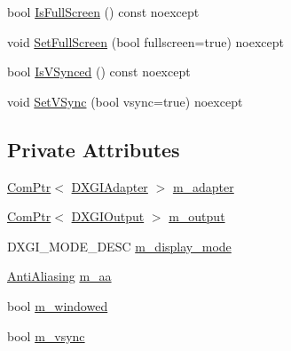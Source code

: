 \begin{DoxyCompactItemize}
\item 
bool \mbox{\hyperlink{classmage_1_1rendering_1_1_display_configuration_a507e755923af2ba1338cc041b5df8e0a}{Is\+Full\+Screen}} () const noexcept
\item 
void \mbox{\hyperlink{classmage_1_1rendering_1_1_display_configuration_a5e15cc1ca56718a7892b80cd0a1d20c0}{Set\+Full\+Screen}} (bool fullscreen=true) noexcept
\item 
bool \mbox{\hyperlink{classmage_1_1rendering_1_1_display_configuration_a6447404f1d720b98b37f684ba0e790a0}{Is\+V\+Synced}} () const noexcept
\item 
void \mbox{\hyperlink{classmage_1_1rendering_1_1_display_configuration_a304a29762afd99caa1672ef6cc259fb3}{Set\+V\+Sync}} (bool vsync=true) noexcept
\end{DoxyCompactItemize}
\subsection*{Private Attributes}
\begin{DoxyCompactItemize}
\item 
\mbox{\hyperlink{namespacemage_ae74f374780900893caa5555d1031fd79}{Com\+Ptr}}$<$ \mbox{\hyperlink{namespacemage_1_1rendering_ad55e028ebd705b547eeb972ad8d03b6a}{D\+X\+G\+I\+Adapter}} $>$ \mbox{\hyperlink{classmage_1_1rendering_1_1_display_configuration_a307a8e6e0b1beb93175a6db519759e86}{m\+\_\+adapter}}
\item 
\mbox{\hyperlink{namespacemage_ae74f374780900893caa5555d1031fd79}{Com\+Ptr}}$<$ \mbox{\hyperlink{namespacemage_1_1rendering_aaf22d3893277a4bd8497f6ea69b01532}{D\+X\+G\+I\+Output}} $>$ \mbox{\hyperlink{classmage_1_1rendering_1_1_display_configuration_a3f43cbe5bb1a1a7c1bfb9ce66052fe0a}{m\+\_\+output}}
\item 
D\+X\+G\+I\+\_\+\+M\+O\+D\+E\+\_\+\+D\+E\+SC \mbox{\hyperlink{classmage_1_1rendering_1_1_display_configuration_a577ada006ada1b1e65a8deb817f0dafe}{m\+\_\+display\+\_\+mode}}
\item 
\mbox{\hyperlink{namespacemage_1_1rendering_ac3f75e49e92b42f2f5fb55c450d8899c}{Anti\+Aliasing}} \mbox{\hyperlink{classmage_1_1rendering_1_1_display_configuration_a03754a6d492393f70f68c619311dfa4c}{m\+\_\+aa}}
\item 
bool \mbox{\hyperlink{classmage_1_1rendering_1_1_display_configuration_a9d2117628e8b8f6a9b6548a9c0b11c36}{m\+\_\+windowed}}
\item 
bool \mbox{\hyperlink{classmage_1_1rendering_1_1_display_configuration_a749335db324a29c8b4ac30acf1c5361d}{m\+\_\+vsync}}
\end{DoxyCompactItemize}



